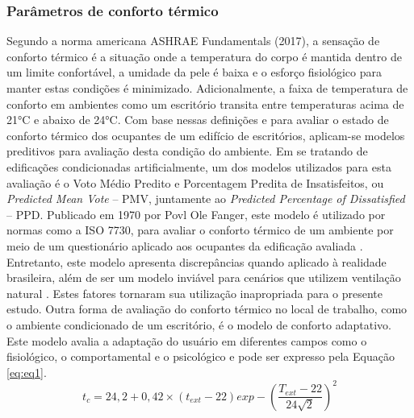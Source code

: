 \subsubsection{Parâmetros de conforto térmico}
Segundo a norma americana ASHRAE Fundamentals (2017), a sensação de conforto térmico 
é a situação onde a temperatura do corpo é mantida dentro de um limite confortável, 
a umidade da pele é baixa e o esforço fisiológico para manter estas condições é minimizado. 
Adicionalmente, a faixa de temperatura de conforto em ambientes como um escritório 
transita entre temperaturas acima de 21°C e abaixo de 24°C. Com base nessas definições 
e para avaliar o estado de conforto térmico dos ocupantes de um edifício de escritórios, 
aplicam-se modelos preditivos para avaliação desta condição do ambiente.\vspace*{0.3cm} \newline
Em se tratando de edificações condicionadas artificialmente, um dos modelos utilizados 
para esta avaliação é o Voto Médio Predito e Porcentagem Predita de Insatisfeitos, 
ou \textit{Predicted Mean Vote} – PMV, juntamente ao \textit{Predicted Percentage of Dissatisfied} – PPD.\vspace*{0.3cm} \newline
Publicado em 1970 por Povl Ole Fanger, este modelo é utilizado por normas como 
a ISO 7730, para avaliar o conforto térmico de um ambiente por meio de um questionário 
aplicado aos ocupantes da edificação avaliada \cite{AmericanSocietyofHeatingRefrigeratingandAir-ConditioningEngineers-ASHRAE2017}. Entretanto, este 
modelo apresenta discrepâncias quando aplicado à realidade brasileira, além de ser um 
modelo inviável para cenários que utilizem ventilação natural \cite{Rupp2016}. 
Estes fatores tornaram sua utilização inapropriada para o presente estudo.
Outra forma de avaliação do conforto térmico no local de trabalho, como o ambiente 
condicionado de um escritório, é o modelo de conforto adaptativo. Este modelo avalia a 
adaptação do usuário em diferentes campos como o fisiológico, o comportamental e o 
psicológico \cite{AmericanSocietyofHeatingRefrigeratingandAir-ConditioningEngineers-ASHRAE2017a} e pode ser expresso pela Equação \ref{eq:eq1}.
\begin{equation}\label{eq:eq1}
            t_{c}=24,2+0,42\times(t_{ext}-22)exp-\left(\frac{T_{ext}-22}{24\sqrt{2}}\right)^2
\end{equation}

